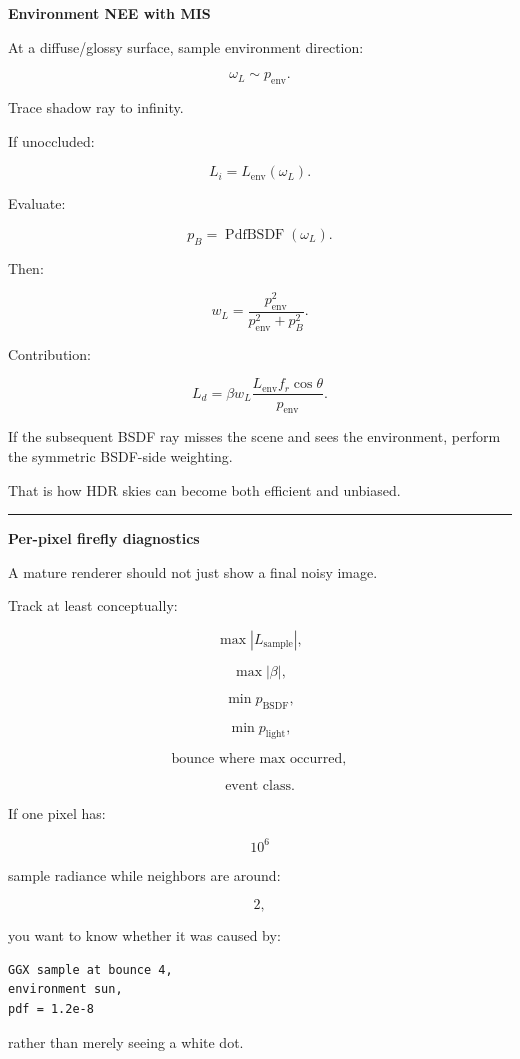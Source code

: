 \textbf{Environment NEE with MIS}

At a diffuse/glossy surface, sample environment direction:

\[
\omega_L
\sim
p_{\text{env}}.
\]

Trace shadow ray to infinity.

If unoccluded:

\[
L_i=
L_{\text{env}}(\omega_L).
\]

Evaluate:

\[
p_B=
\operatorname{PdfBSDF}(\omega_L).
\]

Then:

\[
w_L
=
\frac{
p_{\text{env}}^2
}{
p_{\text{env}}^2+p_B^2
}.
\]

Contribution:

\[
\boxed{
L_d
=
\beta
w_L
\frac{
L_{\text{env}}
f_r
\cos\theta
}{
p_{\text{env}}
}.
}
\]

If the subsequent BSDF ray misses the scene and sees the environment, perform the symmetric BSDF-side weighting.

That is how HDR skies can become both efficient and unbiased.

\begin{center}\rule{0.5\linewidth}{0.5pt}\end{center}

\textbf{Per-pixel firefly diagnostics}

A mature renderer should not just show a final noisy image.

Track at least conceptually:

\[
\max |L_{\text{sample}}|,
\]

\[
\max |\beta|,
\]

\[
\min p_{\text{BSDF}},
\]

\[
\min p_{\text{light}},
\]

\[
\text{bounce where max occurred},
\]

\[
\text{event class}.
\]

If one pixel has:

\[
10^6
\]

sample radiance while neighbors are around:

\[
2,
\]

you want to know whether it was caused by:

\begin{verbatim}
GGX sample at bounce 4,
environment sun,
pdf = 1.2e-8
\end{verbatim}

rather than merely seeing a white dot.

